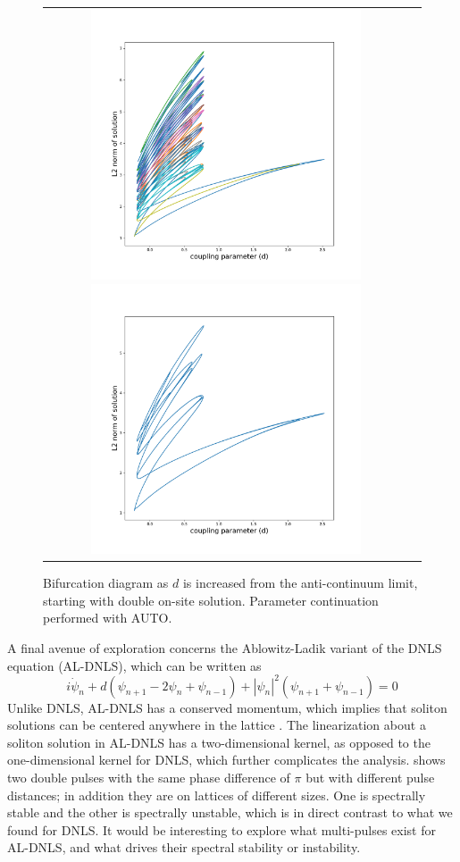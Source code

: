 \documentclass[thesis2.tex]{subfiles}
\begin{document}
\begin{figure}
\begin{center}
\begin{tabular}{cc}
\includegraphics[width=8cm]{images/dnls/bd2.pdf}
\includegraphics[width=8cm]{images/dnls/bd3.pdf}
\end{tabular}
\end{center}
\caption[Bifurcation diagram in DNLS for increasing $d$]{Bifurcation diagram as $d$ is increased from the anti-continuum limit, starting with double on-site solution. Parameter continuation performed with AUTO.}
\label{fig:DNLSbd2}
\end{figure}

A final avenue of exploration concerns the Ablowitz-Ladik variant of the DNLS equation (AL-DNLS), which can be written as
\begin{equation*}
i\dot{\psi}_n + d(\psi_{n+1} - 2 \psi_n + \psi_{n-1}) + |\psi_n|^2 (\psi_{n+1} + \psi_{n-1}) = 0
\end{equation*}
Unlike DNLS, AL-DNLS has a conserved momentum, which implies that soliton solutions can be centered anywhere in the lattice \cite{Kevrekidis2009}. The linearization about a soliton solution in AL-DNLS has a two-dimensional kernel, as opposed to the one-dimensional kernel for DNLS, which further complicates the analysis. \cite[Figure 5]{Kevrekidis2002} shows two double pulses with the same phase difference of $\pi$ but with different pulse distances; in addition they are on lattices of different sizes. One is spectrally stable and the other is spectrally unstable, which is in direct contrast to what we found for DNLS. It would be interesting to explore what multi-pulses exist for AL-DNLS, and what drives their spectral stability or instability.
\end{document}

